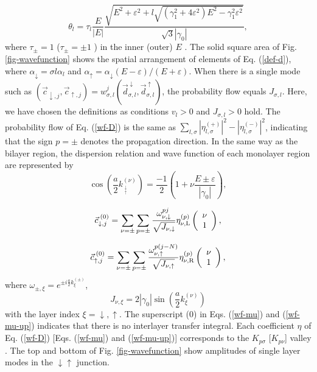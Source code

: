 \documentclass{jpsj3}
\begin{document}
\begin{equation}
\theta_l=\tau_l \frac{E}{|E|} \frac{\sqrt{E^2+\varepsilon^2
+l\sqrt{(\gamma_1^2+4\varepsilon^2)E^2-\gamma_1^2\varepsilon^2}
}}{\sqrt{3}|\gamma_0|},
\label{def-theta}
\end{equation}
where
$\tau_\pm =1$ ($\tau_\pm =\pm 1$ ) in the inner (outer) $E$ \cite{a10.,a10-2.,a10.tuika,a10-note.}.
The solid square area of Fig. \ref{fig-wavefunction}
shows the
 spatial arrangement of elements of Eq. (\ref{def-d}), where $\alpha_\downarrow = \sigma l \alpha_l$ and $\alpha_\uparrow = \alpha_\downarrow (E-\varepsilon)/(E+\varepsilon)$.
When there is a single mode such as $(\vec{c}_{\downarrow,j},\vec{c}_{\uparrow,j})
= w_{\sigma,l}^j(\vec{d}_{\sigma,l}^{\;\downarrow} ,\vec{d}_{\sigma,l}^{\;\uparrow} )$, the probability flow equals $J_{\sigma,l}$.
Here, we have chosen the definitions as conditions $v_l >0$ and $J_{\sigma,l} >0$ hold.
The probability flow of
Eq. (\ref{wf-D}) is the same as $\sum_{l,\sigma}|\eta^{(+)}_{l,\sigma}|^2-|\eta^{(-)}_{l,\sigma}|^2$, indicating that the sign $p=\pm $
denotes the propagation direction.
In the same way as the bilayer region,
the dispersion relation and wave function of each monolayer
region are represented by
\begin{equation}
\cos
\left(\frac{a}{2}k^{(\nu)}_{\;_\uparrow^\downarrow} \right) 
=\frac{-1}{2}\left(1+\nu\frac{E \pm \varepsilon}{|\gamma_0|}\right),
\label{k-mu}
\end{equation}

\begin{equation}
\vec{c}_{\downarrow,j}^{\;(0)} 
=
\sum_{\nu=\pm}
\sum_{p=\pm}
\frac{\omega_{\nu,\downarrow}^{pj}}
{\sqrt{ J_{\nu,\downarrow}}}
\eta^{(p)}_{\nu,{\rm L}}
\left(
\begin{array}{c}
\nu
\\
1
\end{array}
\right),
\label{wf-mu}
\end{equation}


\begin{equation}
\vec{c}_{\uparrow,j}^{\;(0)} 
=
\sum_{\nu=\pm}
\sum_{p=\pm}
\frac{\omega_{\nu,\uparrow}^{p(j-N)}}
{\sqrt{ J_{\nu,\uparrow}}}
\eta^{(p)}_{\nu,{\rm R}}
\left(
\begin{array}{c}
\nu
\\
1
\end{array}
\right),
\label{wf-mu-up}
\end{equation}
where $\omega_{\pm,\xi}=e^{\pm i\frac{a}{2}k_\xi^{(\pm)}}$, 
\begin{equation}
J_{\nu,\xi}=2
|\gamma_0|\sin\left(\frac{a}{2}k_\xi^{(\nu)} \right)
\end{equation}
with the layer index $\xi=\downarrow,\uparrow$.
The superscript (0) in Eqs. (\ref{wf-mu}) and (\ref{wf-mu-up})
indicates that there is no interlayer transfer integral.
Each coefficient $\eta$ of Eq. (\ref{wf-D}) 
[Eqs. (\ref{wf-mu})
and (\ref{wf-mu-up})]
corresponds to the $K_{p\sigma}$ [$K_{p\nu}$] valley .
The top and bottom of Fig. \ref{fig-wavefunction} show amplitudes of 
single layer modes in the $\downarrow\uparrow$ junction.
\end{document}
